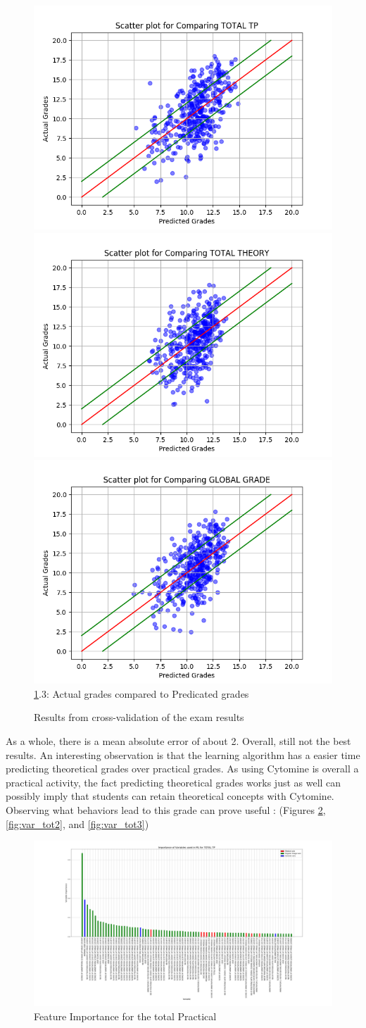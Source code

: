 \documentclass[a4paper,11pt]{report}
\numberwithin{figure}{section} %
\begin{document}
\begin{figure}[H]
      \includegraphics[width=.30\linewidth]{plots/cv_comp_TOTAL_TP_2018-04-27_19_24_46.png}
      \includegraphics[width=.30\linewidth]{plots/cv_comp_TOTAL_THEORY_2018-04-30_13_53_15.png}
  	  \includegraphics[width=.30\linewidth]{plots/cv_comp_GLOBAL_GRADE_2018-04-30_13_48_59.png}
      \\
      \ref{fig:results_tot}.3: Actual grades compared to Predicated grades
      \caption{Results from cross-validation of the exam results}
      \label{fig:results_tot}
    \end{figure}

    As a whole, there is a mean absolute error of about 2.
    Overall, still not the best results.
    An interesting observation is that the learning algorithm has a easier time predicting theoretical grades over practical grades.
    As using Cytomine is overall a practical activity, the fact predicting theoretical grades works just as well can possibly imply that students can retain theoretical concepts with Cytomine.\\

    Observing what behaviors lead to this grade can prove useful : (Figures \ref{fig:var_tot1}, \ref{fig:var_tot2}, and \ref{fig:var_tot3})

      \begin{figure}[H]
      \centering
      \includegraphics[width=.95\linewidth]{plots/var_importance_TOTAL_TP_2018-04-29_14_37_37.png}
      \caption{Feature Importance for the total Practical}
      \label{fig:var_tot1}
      \end{figure}
\end{document}
